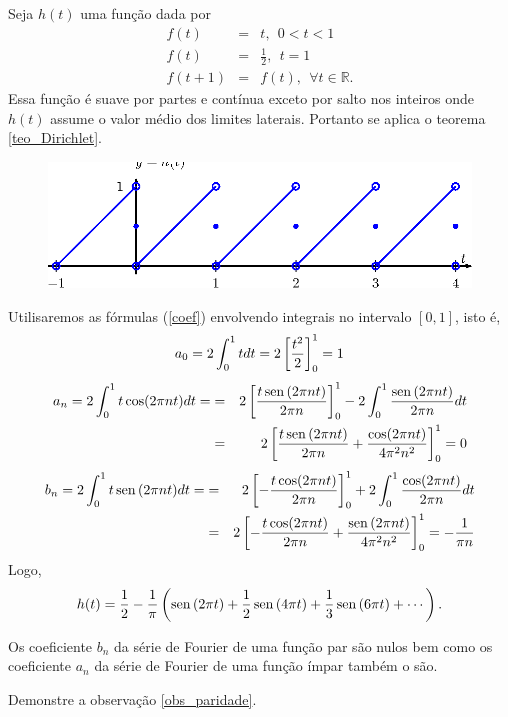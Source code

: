 \begin{ex} Seja $h(t)$ uma função dada por
\begin{eqnarray*}
f(t)&=&t, \ \ 0<t<1\\
f(t)&=&\frac{1}{2}, \ \ t=1\\
f(t+1)&=&f(t),\ \ \forall t\in\mathbb{R}.
\end{eqnarray*}
Essa função é suave por partes e contínua exceto por salto nos inteiros onde $h(t)$ assume o valor médio dos limites laterais. Portanto se aplica o teorema \ref{teo_Dirichlet}.
\begin{figure}[!ht]
\begin{center}

\includegraphics{cap_series/pics/figura_5}\end{center}
\end{figure}
Utilisaremos as fórmulas (\ref{coef}) envolvendo integrais no intervalo $[0,1]$, isto é,
  \begin{equation*}
   a_0= 2\int_{0}^{1} t dt=2\left[\frac{t^2}{2}\right]_0^1=1\\
	\end{equation*}
	\begin{eqnarray*}
   a_n=  2\int_{0}^{1} t\cos(2 \pi n t)dt=&=&2\left[\frac{t\operatorname{sen}\,(2 \pi n t)}{2 \pi n}\right]_0^1-2\int_0^1\frac{\operatorname{sen}\,(2 \pi n t)}{2 \pi n}dt\\
	&=&2\left[\frac{t\operatorname{sen}\,(2 \pi n t)}{2 \pi n}+\frac{\cos(2 \pi n t)}{4\pi^2 n^2}\right]_0^1=0\\
	 \end{eqnarray*}
	\begin{eqnarray*}
   b_n=  2\int_{0}^{1} t\operatorname{sen}\,(2 \pi n t)dt=&=&2\left[-\frac{t\cos(2 \pi n t)}{2 \pi n}\right]_0^1+2\int_0^1\frac{\cos(2 \pi n t)}{2 \pi n}dt\\
	&=&2\left[-\frac{t\cos(2 \pi n t)}{2 \pi n}+\frac{\operatorname{sen}\,(2 \pi n t)}{4\pi^2 n^2}\right]_0^1=-\frac{1}{\pi n}\\
	 \end{eqnarray*}
Logo,
$$
h(t)=\frac{1}{2}-\frac{1}{\pi}\left(\operatorname{sen}\,(2 \pi t)+\frac{1}{2}\operatorname{sen}\,(4\pi t)+\frac{1}{3}\operatorname{sen}\,(6\pi t)+\cdots\right).
$$
\end{ex}
\begin{obs}{\label{obs_paridade}} Os coeficiente $b_n$ da série de Fourier de uma função par são nulos bem como os coeficiente $a_n$ da série de Fourier de uma função ímpar também o são.
\end{obs}
\begin{ex}Demonstre a observação \ref{obs_paridade}.
\end{ex}
